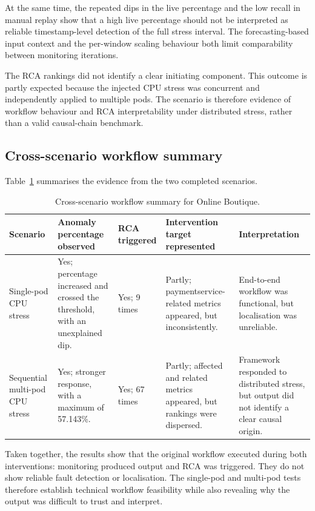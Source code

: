 At the same time, the repeated dips in the live percentage and the low recall in manual replay show that a high live percentage should not be interpreted as reliable timestamp-level detection of the full stress interval. The forecasting-based input context and the per-window scaling behaviour both limit comparability between monitoring iterations.

The RCA rankings did not identify a clear initiating component. This outcome is partly expected because the injected CPU stress was concurrent and independently applied to multiple pods. The scenario is therefore evidence of workflow behaviour and RCA interpretability under distributed stress, rather than a valid causal-chain benchmark.

\subsection{Cross-scenario workflow summary}
Table~\ref{tab:online_boutique_workflow_summary} summarises the evidence from the two completed scenarios.

\begin{table}[htbp]
    \centering
    \small
    \caption{Cross-scenario workflow summary for Online Boutique.}
    \label{tab:online_boutique_workflow_summary}
    \begin{tabular}{p{} p{} p{} p{} p{}}
        \toprule
        \textbf{Scenario} & \textbf{Anomaly percentage observed} & \textbf{RCA triggered} & \textbf{Intervention target represented} & \textbf{Interpretation} \\
        \midrule
        Single-pod CPU stress & Yes; percentage increased and crossed the threshold, with an unexplained dip. & Yes; 9 times & Partly; paymentservice-related metrics appeared, but inconsistently. & End-to-end workflow was functional, but localisation was unreliable. \\
        Sequential multi-pod CPU stress & Yes; stronger response, with a maximum of 57.143\%. & Yes; 67 times & Partly; affected and related metrics appeared, but rankings were dispersed. & Framework responded to distributed stress, but output did not identify a clear causal origin. \\
        \bottomrule
    \end{tabular}
\end{table}

Taken together, the results show that the original workflow executed during both interventions: monitoring produced output and RCA was triggered. They do not show reliable fault detection or localisation. The single-pod and multi-pod tests therefore establish technical workflow feasibility while also revealing why the output was difficult to trust and interpret.

